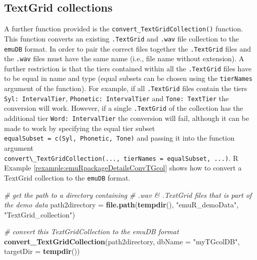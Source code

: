 \documentclass[]{book}
\newenvironment{Shaded}{\begin{snugshade}}{\end{snugshade}}
\newcommand{\CommentTok}[1]{\textcolor[rgb]{0.56,0.35,0.01}{\textit{#1}}}
\newcommand{\DataTypeTok}[1]{\textcolor[rgb]{0.13,0.29,0.53}{#1}}
\newcommand{\KeywordTok}[1]{\textcolor[rgb]{0.13,0.29,0.53}{\textbf{#1}}}
\newcommand{\NormalTok}[1]{#1}
\newcommand{\StringTok}[1]{\textcolor[rgb]{0.31,0.60,0.02}{#1}}
\theoremstyle{definition}
\theoremstyle{definition}
\theoremstyle{definition}
\theoremstyle{remark}
\begin{document}
\hypertarget{textgrid-collections}{%
\subsection{TextGrid collections}\label{textgrid-collections}}

A further function provided is the
\texttt{convert\_TextGridCollection()} function. This function converts
an existing \texttt{.TextGrid} and \texttt{.wav} file collection to the
\texttt{emuDB} format. In order to pair the correct files together the
\texttt{.TextGrid} files and the \texttt{.wav} files must have the same
name (i.e., file name without extension). A further restriction is that
the tiers contained within all the \texttt{.TextGrid} files have to be
equal in name and type (equal subsets can be chosen using the
\texttt{tierNames} argument of the function). For example, if all
\texttt{.TextGrid} files contain the tiers \texttt{Syl:\ IntervalTier},
\texttt{Phonetic:\ IntervalTier} and \texttt{Tone:\ TextTier} the
conversion will work. However, if a single \texttt{.TextGrid} of the
collection has the additional tier \texttt{Word:\ IntervalTier} the
conversion will fail, although it can be made to work by specifying the
equal tier subset
\texttt{equalSubset\ =\ c(\textquotesingle{}Syl\textquotesingle{},\ \textquotesingle{}Phonetic\textquotesingle{},\ \textquotesingle{}Tone\textquotesingle{})}
and passing it into the function argument
\texttt{convert\textbackslash{}\_TextGridCollection(...,\ tierNames\ =\ equalSubset,\ ...)}.
R Example \ref{rexample:emuRpackageDetailsConvTGcol} shows how to
convert a TextGrid collection to the \texttt{emuDB} format.

\begin{Shaded}
\begin{Highlighting}[]
\CommentTok{# get the path to a directory containing}
\CommentTok{# .wav & .TextGrid files that is part of the demo data}
\NormalTok{path2directory =}\StringTok{ }\KeywordTok{file.path}\NormalTok{(}\KeywordTok{tempdir}\NormalTok{(),}
                           \StringTok{"emuR_demoData"}\NormalTok{,}
                           \StringTok{"TextGrid_collection"}\NormalTok{)}

\CommentTok{# convert this TextGridCollection to the emuDB format}
\KeywordTok{convert_TextGridCollection}\NormalTok{(path2directory, }\DataTypeTok{dbName =} \StringTok{"myTGcolDB"}\NormalTok{,}
                           \DataTypeTok{targetDir =} \KeywordTok{tempdir}\NormalTok{())}
\end{Highlighting}
\end{Shaded}
\end{document}
